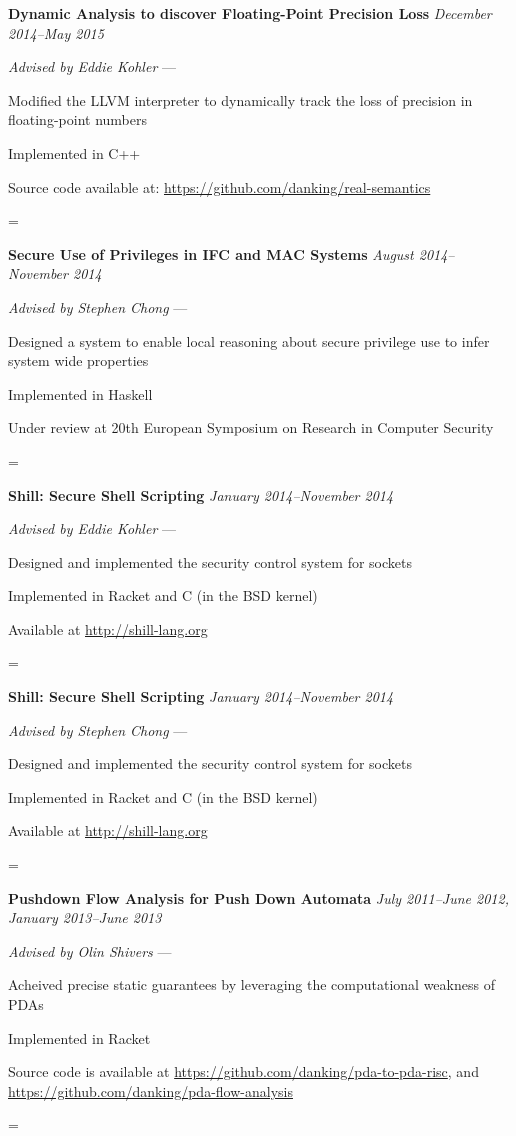 \documentclass[10pt]{article}
\newenvironment{absolutelynopagebreak}
  {\par\nobreak\vfil\penalty0\vfilneg
   \vtop\bgroup}
  {\par\xdef\tpd{\the\prevdepth}\egroup
   \prevdepth=\tpd}
\newenvironment{my-itemize}
  {\begin{itemize*}
   \renewcommand{\labelitemi}{$\angle$}
  }
  {\end{itemize*}}
\newcommand{\job}[6]{
  \begin{absolutelynopagebreak}
  \vspace{-5pt}
  \begin{tabbing} {\bf #1} \` {\small \textit{#3}} \end{tabbing}
  \vspace{-12pt}
  \begin{my-itemize}
  \setlength\itemsep{1pt}
  \item [] {\textit{#4} \ifthenelse{\equal{#5}{}}
                                   {}
                                   {--- #5}}
  #6
  \end{my-itemize}%
  \end{absolutelynopagebreak}
  \vspace{-18pt}
}
\begin{document}
\job{Dynamic Analysis to discover Floating-Point Precision Loss}
    {}
    {December 2014--May 2015}
    {Advised by Eddie Kohler}
    {}{
  \item{Modified the LLVM interpreter to dynamically track the loss of precision
    in floating-point numbers}
  \item{Implemented in C++}
  \item{Source code available at: \url{https://github.com/danking/real-semantics}}
}

\job{Secure Use of Privileges in IFC and MAC Systems}
    {}
    {August 2014--November 2014}
    {Advised by Stephen Chong}
    {}{
  \item{Designed a system to enable local reasoning about secure privilege use
     to infer system wide properties}
  \item{Implemented in Haskell}
  \item{Under review at 20th European Symposium on Research in Computer Security}
}

\job{Shill: Secure Shell Scripting}
    {}
    {January 2014--November 2014}
    {Advised by Eddie Kohler}
    {}{
  \item{Designed and implemented the security control system for sockets}
  \item{Implemented in Racket and C (in the BSD kernel)}
  \item{Available at \url{http://shill-lang.org}}
}

\job{Shill: Secure Shell Scripting}
    {}
    {January 2014--November 2014}
    {Advised by Stephen Chong}
    {}{
  \item{Designed and implemented the security control system for sockets}
  \item{Implemented in Racket and C (in the BSD kernel)}
  \item{Available at \url{http://shill-lang.org}}
}

\job{Pushdown Flow Analysis for Push Down Automata}
    {}
    {July 2011--June 2012, January 2013--June 2013}
    {Advised by Olin Shivers}
    {}{
  \item{Acheived precise static guarantees by leveraging the computational
     weakness of PDAs}
  \item{Implemented in Racket}
  \item{Source code is available at
    \url{https://github.com/danking/pda-to-pda-risc}, and \\
    \url{https://github.com/danking/pda-flow-analysis}}
}
\end{document}

